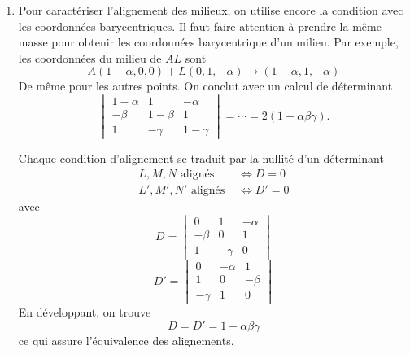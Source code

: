 \begin{enumerate}
  \item Pour caractériser l'alignement des milieux, on utilise encore la condition avec les coordonnées barycentriques. Il faut faire attention à prendre la même masse pour obtenir les coordonnées barycentrique d'un milieu. Par exemple, les coordonnées du milieu de $AL$ sont
\begin{displaymath}
  A (1-\alpha,0,0) + L(0,1,-\alpha) \rightarrow (1-\alpha, 1, -\alpha)
\end{displaymath}
De même pour les autres points. On conclut avec un calcul de déterminant
\begin{displaymath}
\begin{vmatrix}
  1- \alpha & 1       & -\alpha \\
  -\beta    & 1-\beta & 1 \\
  1         & -\gamma & 1-\gamma
\end{vmatrix}
= \cdots = 2(1-\alpha \beta \gamma).
\end{displaymath}

Chaque condition d'alignement se traduit par la nullité d'un déterminant
\begin{align*}
  L, M, N \text{ alignés } &\Leftrightarrow D = 0 \\
  L', M', N' \text{ alignés } &\Leftrightarrow  D' = 0
\end{align*}
avec
\begin{displaymath}
  D = 
\begin{vmatrix}
  0      & 1       & - \alpha \\
  -\beta & 0       & 1 \\
  1      & -\gamma & 0
\end{vmatrix}
\end{displaymath}
\begin{displaymath}
  D' = 
\begin{vmatrix}
  0       & - \alpha & 1  \\
  1       & 0       & -\beta \\
  -\gamma & 1 & 0
\end{vmatrix}
\end{displaymath}
En développant, on trouve 
\begin{displaymath}
  D = D' = 1 - \alpha \beta \gamma
\end{displaymath}
ce qui assure l'équivalence des alignements.
\end{enumerate}
